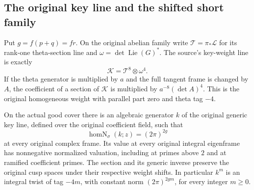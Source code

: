 \subsection{The original key line and the shifted short family}
\label{sec:actual-key-short-span}

Put $g=f(p+q)=fr$.  On the original abelian family write
$\mathcal T=\pi_*\mathscr L$ for its rank-one theta-section line
and $\omega=\det\operatorname{Lie}(G)^*$.
The source's key-weight line is exactly
\[
                     \mathcal K=\mathcal T^8\otimes\omega^4.
\]
If the theta generator is multiplied by $a$ and the full tangent
frame is changed by $A$, the coefficient of a section of
$\mathcal K$ is multiplied by $a^{-8}(\det A)^4$.
This is the original homogeneous weight with parallel part zero
and theta tag $-4$.

\begin{proposition}\label{prop:actual-integral-key-shift}
On the actual good cover there is an algebraic generator $k$ of
the original generic key line, defined over the original coefficient
field, such that
\[
                  \operatorname{homN}_\sigma(k;z)=(2\pi)^{2g}
\]
at every original complex frame.  Its value at every original
integral eigenframe has nonnegative normalized valuation, including
at primes above $2$ and at ramified coefficient primes.  The section
and its generic inverse preserve the original cusp spaces under
their respective weight shifts.  In particular $k^m$ is an integral
twist of tag $-4m$, with constant norm $(2\pi)^{2gm}$, for every
integer $m\ge0$.
\end{proposition}

